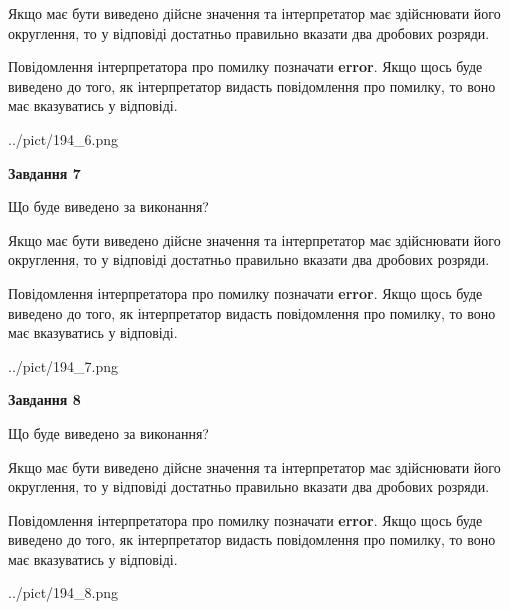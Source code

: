 \documentclass[12pt, ukrainian]{article}
\begin{document}
{\begin {Large}
Якщо має бути виведено дійсне значення та інтерпретатор має здійснювати його округлення, 
то у відповіді достатньо правильно вказати два дробових розряди.

Повідомлення інтерпретатора про помилку позначати \textbf{error}.
Якщо щось буде виведено до того, як інтерпретатор видасть повідомлення про помилку, 
то воно має вказуватись у відповіді. \par

\begin{center}
	{../pict/194_6.png}
\end{center}
\newpage

{\begin {center}\textbf{Завдання 7}\end {center}}\par
Що буде виведено за виконання? \par

Якщо має бути виведено дійсне значення та інтерпретатор має здійснювати його округлення, 
то у відповіді достатньо правильно вказати два дробових розряди.

Повідомлення інтерпретатора про помилку позначати \textbf{error}.
Якщо щось буде виведено до того, як інтерпретатор видасть повідомлення про помилку, 
то воно має вказуватись у відповіді. \par

\begin{center}
	{../pict/194_7.png}
\end{center}
\newpage

{\begin {center}\textbf{Завдання 8}\end {center}}\par
Що буде виведено за виконання? \par

Якщо має бути виведено дійсне значення та інтерпретатор має здійснювати його округлення, 
то у відповіді достатньо правильно вказати два дробових розряди.

Повідомлення інтерпретатора про помилку позначати \textbf{error}.
Якщо щось буде виведено до того, як інтерпретатор видасть повідомлення про помилку, 
то воно має вказуватись у відповіді. \par

\begin{center}
	{../pict/194_8.png}
\end{center}
\newpage


\end{Large}}
\end{document}
